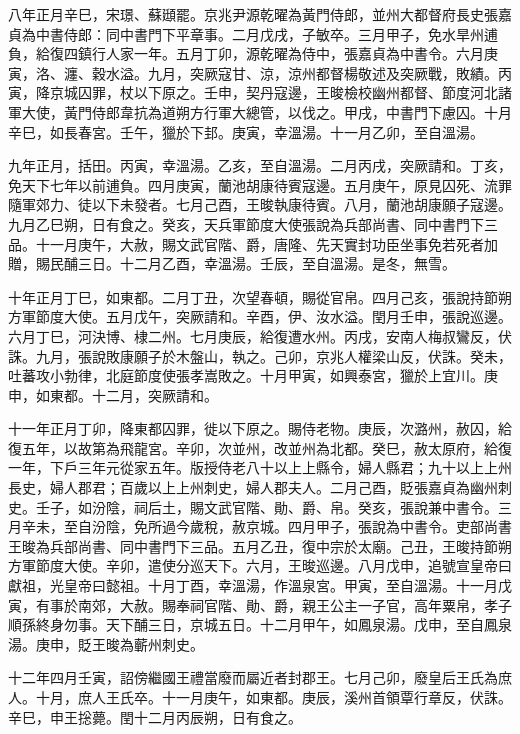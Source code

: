 \begin{pinyinscope}
 八年正月辛巳，宋璟、蘇頲罷。京兆尹源乾曜為黃門侍郎，並州大都督府長史張嘉貞為中書侍郎：同中書門下平章事。二月戊戌，子敏卒。三月甲子，免水旱州逋負，給復四鎮行人家一年。五月丁卯，源乾曜為侍中，張嘉貞為中書令。六月庚寅，洛、瀍、穀水溢。九月，突厥寇甘、涼，涼州都督楊敬述及突厥戰，敗績。丙寅，降京城囚罪，杖以下原之。壬申，契丹寇邊，王晙檢校幽州都督、節度河北諸軍大使，黃門侍郎韋抗為道朔方行軍大總管，以伐之。甲戌，中書門下慮囚。十月辛巳，如長春宮。壬午，獵於下邽。庚寅，幸溫湯。十一月乙卯，至自溫湯。



 九年正月，括田。丙寅，幸溫湯。乙亥，至自溫湯。二月丙戌，突厥請和。丁亥，免天下七年以前逋負。四月庚寅，蘭池胡康待賓寇邊。五月庚午，原見囚死、流罪隨軍郊力、徒以下未發者。七月己酉，王晙執康待賓。八月，蘭池胡康願子寇邊。九月乙巳朔，日有食之。癸亥，天兵軍節度大使張說為兵部尚書、同中書門下三品。十一月庚午，大赦，賜文武官階、爵，唐隆、先天實封功臣坐事免若死者加贈，賜民酺三日。十二月乙酉，幸溫湯。壬辰，至自溫湯。是冬，無雪。



 十年正月丁巳，如東都。二月丁丑，次望春頓，賜從官帛。四月己亥，張說持節朔方軍節度大使。五月戊午，突厥請和。辛酉，伊、汝水溢。閏月壬申，張說巡邊。六月丁巳，河決博、棣二州。七月庚辰，給復遭水州。丙戌，安南人梅叔鸞反，伏誅。九月，張說敗康願子於木盤山，執之。己卯，京兆人權梁山反，伏誅。癸未，吐蕃攻小勃律，北庭節度使張孝嵩敗之。十月甲寅，如興泰宮，獵於上宜川。庚申，如東都。十二月，突厥請和。



 十一年正月丁卯，降東都囚罪，徙以下原之。賜侍老物。庚辰，次潞州，赦囚，給復五年，以故第為飛龍宮。辛卯，次並州，改並州為北都。癸巳，赦太原府，給復一年，下戶三年元從家五年。版授侍老八十以上上縣令，婦人縣君；九十以上上州長史，婦人郡君；百歲以上上州刺史，婦人郡夫人。二月己酉，貶張嘉貞為幽州刺史。壬子，如汾陰，祠后土，賜文武官階、勛、爵、帛。癸亥，張說兼中書令。三月辛未，至自汾陰，免所過今歲稅，赦京城。四月甲子，張說為中書令。吏部尚書王晙為兵部尚書、同中書門下三品。五月乙丑，復中宗於太廟。己丑，王晙持節朔方軍節度大使。辛卯，遣使分巡天下。六月，王晙巡邊。八月戊申，追號宣皇帝曰獻祖，光皇帝曰懿祖。十月丁酉，幸溫湯，作溫泉宮。甲寅，至自溫湯。十一月戊寅，有事於南郊，大赦。賜奉祠官階、勛、爵，親王公主一子官，高年粟帛，孝子順孫終身勿事。天下酺三日，京城五日。十二月甲午，如鳳泉湯。戊申，至自鳳泉湯。庚申，貶王晙為蘄州刺史。



 十二年四月壬寅，詔傍繼國王禮當廢而屬近者封郡王。七月己卯，廢皇后王氏為庶人。十月，庶人王氏卒。十一月庚午，如東都。庚辰，溪州首領覃行章反，伏誅。辛巳，申王捴薨。閏十二月丙辰朔，日有食之。




\end{pinyinscope}

